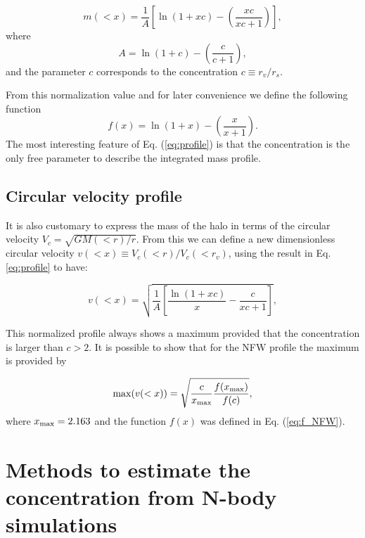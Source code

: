 \documentclass[a4,useAMS,usenatbib,usegraphicx]{mn2e}
\begin{document}
\begin{equation}
m(<x) =
\frac{1}{A}\left[\ln\left(1+xc\right)-\left(\frac{xc}{xc+1}\right)\right],
\label{eq:profile}
\end{equation}
%
where
%
\begin{equation}
A=\ln\left(1+c\right)-\left(\frac{c}{c+1}\right),
\end{equation}
%
and the parameter $c$ corresponds to the concentration $c\equiv r_v/r_s$.

From this normalization value and for later convenience we define the
following function
%
\begin{equation}
f(x) = \ln\left(1+x\right)-\left(\frac{x}{x+1}\right).
\label{eq:f_NFW}
\end{equation}
%
The most interesting feature of Eq. (\ref{eq:profile}) is that the
concentration is the only free parameter to describe the integrated
mass profile.
 
\subsection{Circular velocity profile}

It is also customary to express the mass of the halo in terms of the
circular velocity $V_{c}=\sqrt{GM(<r)/r}$.
From this we can define a new dimensionless circular velocity $v(<x)\equiv
V_{c}(<r)/V_{c}(<r_v)$, using the result in Eq. \ref{eq:profile}
to have:

\begin{equation}
v(<x)=\sqrt{\frac{1}{A}\left[\frac{\ln\left(1+xc\right)}{x}-\frac{c}{xc+1}\right]},
\end{equation}


This normalized profile always shows a maximum provided that the
concentration is larger than $c>2$.
It is possible to show that for the NFW profile the maximum is
provided by

\begin{equation}
\mathrm{max}(v(<x)) = \sqrt{\frac{c}{x_{\rm max}}\frac{f(x_{\rm
      max})}{f(c)}},
\label{eq:max_v}
\end{equation}
where $x_{\rm max}=2.163$ \citep{Klypin2014} and the function $f(x)$
was defined in Eq. (\ref{eq:f_NFW}).

\section{Methods to estimate the concentration from N-body simulations}
\label{sec:method}
\end{document}
